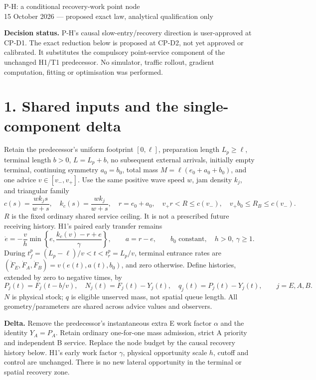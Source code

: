\documentclass[11pt,a4paper]{article}
\begin{document}
\begin{center}
{\Large P-H: a conditional recovery-work point node}\\[4pt]
15 October 2026 --- proposed exact law, analytical qualification only
\end{center}

\textbf{Decision status.} P-H's causal slow-entry/recovery direction is
user-approved at CP-D1. The exact reduction below is proposed at CP-D2,
not yet approved or calibrated. It substitutes the compulsory point-service
component of the unchanged H1/T1 predecessor. No simulator, traffic rollout,
gradient computation, fitting or optimisation was performed.

\section*{1. Shared inputs and the single-component delta}

Retain the predecessor's uniform footprint $[0,\ell]$, preparation length
$L_p\geq\ell$, terminal length $b>0$, $L=L_p+b$, no subsequent external
arrivals, initially empty terminal, continuing symmetry $a_0=b_0$, total
mass $M=\ell(e_0+a_0+b_0)$, and one advice $v\in[v_-,v_+]$.
Use the same positive wave speed $w$, jam density $k_j$, and triangular family
\begin{equation}
 c(s)=\frac{wk_js}{w+s},\quad k_c(s)=\frac{wk_j}{w+s},\quad
 r=e_0+a_0,\quad v_+r<R\leq c(v_-),\quad
 v_+b_0\leq R_B\leq c(v_-).
 \tag{1}
\end{equation}
$R$ is the fixed ordinary shared service ceiling. It is not a prescribed
future receiving history. H1's paired early transfer remains
\begin{equation}
 \dot e=-\frac{v}{h}\min\left\{e,\frac{k_c(v)-r+e}{\gamma}\right\},
 \qquad a=r-e,\qquad b_0\text{ constant},\quad h>0,\ \gamma\geq1.
 \tag{2}
\end{equation}
During $t_f^p=(L_p-\ell)/v<t<t_r^p=L_p/v$, terminal entrance rates
are $(\dot F_E,\dot F_A,\dot F_B)=v(e(t),a(t),b_0)$, and zero otherwise.
Define histories, extended by zero to negative times, by
\begin{equation}
 P_j(t)=F_j(t-b/v),\quad N_j(t)=F_j(t)-Y_j(t),\quad
 q_j(t)=P_j(t)-Y_j(t),\qquad j=E,A,B.
 \tag{3}
\end{equation}
$N$ is physical stock; $q$ is eligible unserved mass, not spatial queue
length. All geometry/parameters are shared across advice values and observers.

\textbf{Delta.} Remove the predecessor's instantaneous extra E work factor
$\alpha$ and the identity $Y_A=P_A$. Retain ordinary one-for-one mass
admission, strict A priority and independent B service. Replace the node
budget by the causal recovery history below. H1's early work factor
$\gamma$, physical opportunity scale $h$, cutoff and control are unchanged.
There is no new lateral opportunity in the terminal or spatial recovery zone.
\end{document}
